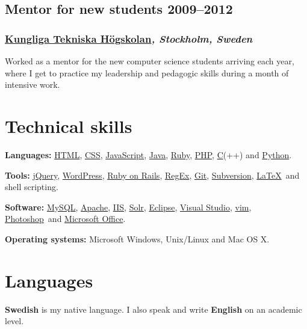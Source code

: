 \documentclass[a4paper,11pt]{article}
\newcommand{\thework}[2]{
  \subsection*{\textbf{#1} \hfill \textbf{#2}}\par%
}
\newcommand{\theplace}[2][]{%
  \subsubsection*{\textbf{#2}\textsl{#1}}%
}
\newcommand{\runin}[1]{%
  \vspace{2mm}
  \hspace{0mm}%
  {\normalsize \bfseries #1}%
}
\def\apache{\href{http://httpd.apache.org/}{Apache}}
\def\clang{\href{http://en.wikipedia.org/wiki/C_\%28programming_language\%29}{C}}
\def\css{\href{http://en.wikipedia.org/wiki/Cascading_Style_Sheets}{CSS}}
\def\eclipse{\href{http://www.eclipse.org/eclipse/}{Eclipse}}
\def\git{\href{http://git-scm.com/}{Git}}
\def\html{\href{http://en.wikipedia.org/wiki/HTML}{HTML}}
\def\iis{\href{http://www.iis.net/}{IIS}}
\def\java{\href{http://www.java.com/}{Java}}
\def\javascript{\href{http://en.wikipedia.org/wiki/JavaScript}{JavaScript}}
\def\jquery{\href{http://jquery.com/}{jQuery}}
\def\latex{\href{http://en.wikipedia.org/wiki/LaTeX}{LaTeX}}
\def\mysql{\href{http://www.mysql.com/}{MySQL}}
\def\office{\href{http://office.microsoft.com/}{Microsoft Office}}
\def\photoshop{\href{http://www.adobe.com/products/photoshop.html}{Photoshop}}
\def\php{\href{http://php.net}{PHP}}
\def\python{\href{http://www.python.org/}{Python}}
\def\regex{\href{http://en.wikipedia.org/wiki/Regular_expressions}{RegEx}}
\def\ror{\href{http://rubyonrails.org}{Ruby on Rails}}
\def\ruby{\href{http://www.ruby-lang.org/}{Ruby}}
\def\solr{\href{http://lucene.apache.org/solr/}{Solr}}
\def\svn{\href{http://subversion.apache.org/}{Subversion}}
\def\vim{\href{http://www.vim.org/}{vim}}
\def\wordpress{\href{http://wordpress.org}{WordPress}}
\def\vs{\href{http://www.microsoft.com/visualstudio/}{Visual Studio}}
\begin{document}
\thework{Mentor for new students}{2009--2012}
\theplace[, Stockholm, Sweden]{\href{http://kth.se}{Kungliga Tekniska Högskolan}}
Worked as a mentor for the new computer science students arriving each
year, where I get to practice my leadership and pedagogic skills during a month
of intensive work.

\section*{Technical skills}%
\vspace{-2mm}

\runin{Languages:} \html, \css, \javascript, \java, \ruby, \php, \clang(++) and \python.

\runin{Tools:} \jquery, \wordpress, \ror, \regex, \git, \svn, \latex\ and shell scripting.

\runin{Software:} \mysql, \apache, \iis, \solr, \eclipse, \vs, \vim, \photoshop\ and \office.

\runin{Operating systems:} Microsoft Windows, Unix/Linux and Mac OS X.

\section*{Languages}%
\textbf{Swedish} is my native language. I also speak and write \textbf{English} on an academic level.
\end{document}
